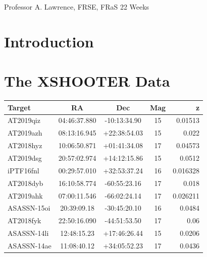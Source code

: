 \documentclass[a4paper,11pt]{article}
\begin{document}
\vfill
{} Professor A. Lawrence, FRSE, FRaS
\hfill
22 Weeks

\newpage
\setcounter{page}{1} %
\tableofcontents

\newpage
\section{Introduction}\label{sec:introduction}

\section{The XSHOOTER Data}

\centering
\begin{tabular}
    {| l | c | c | c | r |}
    \hline
    Target      & RA           & Dec          & Mag  & z        \\
    \hline
    AT2019qiz   & 04:46:37.880 & -10:13:34.90 & 15   & 0.01513  \\
    AT2019azh   & 08:13:16.945 & +22:38:54.03 & 15   & 0.022    \\
    AT2018hyz   & 10:06:50.871 & +01:41:34.08 & 17   & 0.04573  \\
    AT2019dsg   & 20:57:02.974 & +14:12:15.86 & 15   & 0.0512   \\
    iPTF16fnl   & 00:29:57.010 & +32:53:37.24 & 16   & 0.016328 \\
    AT2018dyb   & 16:10:58.774 & -60:55:23.16 & 17   & 0.018    \\
    AT2019ahk   & 07:00:11.546 & -66:02:24.14 & 17   & 0.026211 \\
    ASASSN-15oi & 20:39:09.18  & -30:45:20.10 & 16   & 0.0484   \\
    AT2018fyk   & 22:50:16.090 & -44:51:53.50 & 17   & 0.06     \\
    ASASSN-14li & 12:48:15.23  & +17:46:26.44 & 15   & 0.0206   \\
    ASASSN-14ae & 11:08:40.12  & +34:05:52.23 & 17   & 0.0436   \\
    \hline
\end{tabular}
\end{document}
